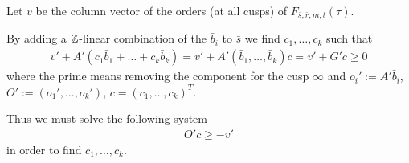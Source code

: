 \documentclass{article}
\begin{document}
Let $v$ be the column vector of the orders (at all cusps) of
$F_{\bar{s},\bar{r},m,t}(\tau)$.

By adding a $\setZ$-linear
combination of the $\bar{b}_i$ to $\bar{s}$ we find
$c_1,\ldots,c_k$ such that
\begin{gather}
  v' + A'(c_1\bar{b}_1+\dots+c_k\bar{b}_k)
  =
  v' + A'(\bar{b}_1,\ldots,\bar{b}_k) c
  =
  v' + G' c
  \ge 0
\end{gather}
where the prime means removing the component for the cusp $\infty$
and $o_i':= A' \bar{b}_i$, $O':=(o_1',\ldots,o_k')$,
$c = (c_1,\ldots, c_k)^T$.

Thus we must solve the following system
\begin{gather}
  \label{eq:remove-non-infinity-poles}
  O' c \ge -v'
\end{gather}
in order to find $c_1,\ldots, c_k$.


\iffalse
By subtracting a $\setZ$-linear
combination of the $\bar{b}_i$ from $\bar{s}$ we find
$c_1,\ldots,c_k$ such that
\begin{gather}
  v' - A'(c_1\bar{b}_1+\dots+c_k\bar{b}_k)
  =
  v' - A'(\bar{b}_1,\ldots,\bar{b}_k) c
  =
  - u' + G' c
  \ge 0
\end{gather}
where the prime means removing the component for the cusp $\infty$
and $u':=-v'$, $g_i':= - A' \bar{b}_i$, $G':=(g_1',\ldots,g_k')$,
$c = (c_1,\ldots, c_k)^T$.

In the implementation we work with grades (which is the negation of
the expansion order and corresponds to the pole order of the
expansion). Thus we must solve the following system
\begin{gather}
  \label{eq:remove-non-infinity-poles}
  G' c \ge u'
\end{gather}
in order to find $c_1,\ldots, c_k$.
\fi




\end{document}

